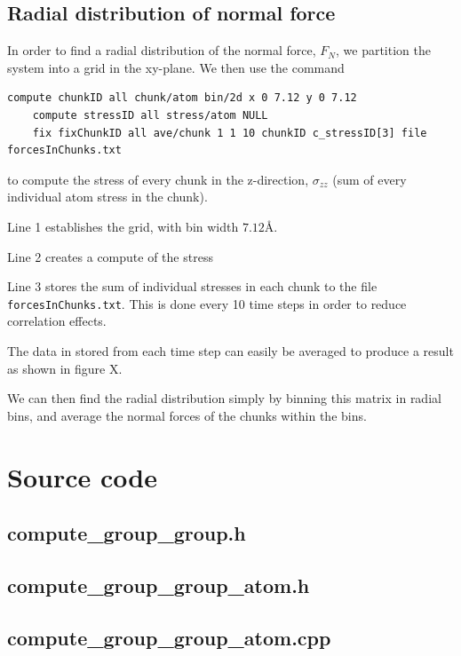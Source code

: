 \documentclass[twoside,english]{uiofysmaster}
\begin{document}
\section{Radial distribution of normal force}
In order to find a radial distribution of the normal force, $F_N$, we partition the system into a grid in  the xy-plane. We then use the command 

\begin{lstlisting}[language=LammpsInput]
	compute chunkID all chunk/atom bin/2d x 0 7.12 y 0 7.12
	compute stressID all stress/atom NULL
	fix fixChunkID all ave/chunk 1 1 10 chunkID c_stressID[3] file forcesInChunks.txt
\end{lstlisting} 
to compute the stress of every chunk in the z-direction, $\sigma_{zz}$ (sum of every individual atom stress in the chunk). 

Line 1 establishes the grid, with bin width $7.12$Å.

Line 2 creates a compute of the stress

Line 3 stores the sum of individual stresses in each chunk to the file \texttt{forcesInChunks.txt}. 
This is done every 10 time steps in order to reduce correlation effects. 

The data in stored from each time step can easily be averaged to produce a result as shown in figure X.

We can then find the radial distribution simply by binning this matrix in radial bins, and average the normal forces of the chunks within the bins.



\appendix
\chapter{Source code}

\newpage
\section{compute\_group\_group.h}
\label{groupgrouph}


\newpage
\section{compute\_group\_group\_atom.h}



\newpage
\section{compute\_group\_group\_atom.cpp}






\end{document}
